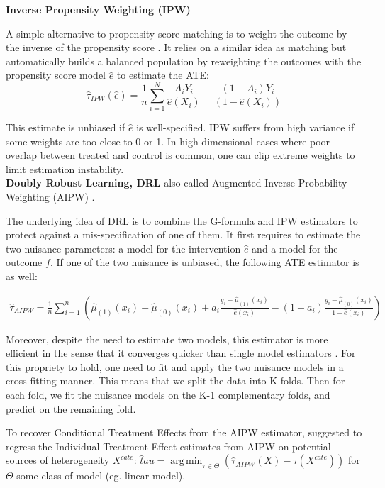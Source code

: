 \documentclass[10pt,letterpaper]{article}
\DeclareMathOperator*{\argmin}{arg\,min}
\begin{document}
\textbf{Inverse Propensity Weighting (IPW)}

A simple alternative to propensity score matching is to weight the outcome by
the inverse of the propensity score \cite{austin2015moving}. It relies on a
similar idea as matching but automatically builds a balanced population by
reweighting the outcomes with the propensity score model $\hat{e}$ to estimate
the ATE:
\begin{equation}
    \hat \tau_{IPW}(\hat e) = \frac{1}{n} \sum_{i=1}^N \frac{A_i Y_i}{\hat e(X_i)} - \frac{(1-A_i)Y_i}{(1-\hat e(X_i))}
\end{equation}

This estimate is unbiased if $\hat e$ is well-specified. IPW suffers from high
variance if some weights are too close to 0 or 1. In high dimensional cases
where poor overlap between treated and control is common, one can clip extreme
weights to limit estimation instability.\\


\textbf{Doubly Robust Learning, DRL} also called Augmented Inverse
Probability Weighting (AIPW) \cite{robins1994estimation}.

The underlying idea of DRL is to combine the G-formula and IPW estimators to
protect against a mis-specification of one of them. It first requires to
estimate the two nuisance parameters: a model for the intervention $\hat{e}$
and a model for the outcome $f$. If one of the two nuisance is unbiased, the
following ATE estimator is as well:

$$\begin{aligned} \widehat{\tau}_{A I P W}=\frac{1}{n}
        \sum_{i=1}^{n}\left(\hat \mu_{(1)}\left(x_{i}\right)-\hat \mu_{(0)}\left(x_{i}\right)+a_{i}
        \frac{y_{i}-\hat \mu_{(1)}\left(x_{i}\right)}{\hat{e}\left(x_{i}\right)}-\left(1-a_{i}\right)
        \frac{y_{i}-\hat \mu_{(0)}\left(x_{i}\right)}{1-\hat{e}\left(x_{i}\right)}\right)
    \end{aligned}$$

Moreover, despite the need to estimate two models, this estimator is more
efficient in the sense that it converges quicker than single model estimators
\cite{wager2020stats}. For this propriety to hold, one need to fit and apply
the two nuisance models in a cross-fitting manner. This means that we split
the data into K folds. Then for each fold, we fit the nuisance models on the
K-1 complementary folds, and predict on the remaining fold.

To recover Conditional Treatment Effects from the AIPW estimator,
\cite{foster2019orthogonal} suggested to regress the Individual Treatment
Effect estimates from AIPW on potential sources of heterogeneity $X^{cate}$:
$\hat tau = \argmin_{\tau \in \Theta} (\hat \tau_{AIPW}(X) - \tau(X^{cate}))$
for $\Theta$ some class of model (eg. linear model).\\
\end{document}
